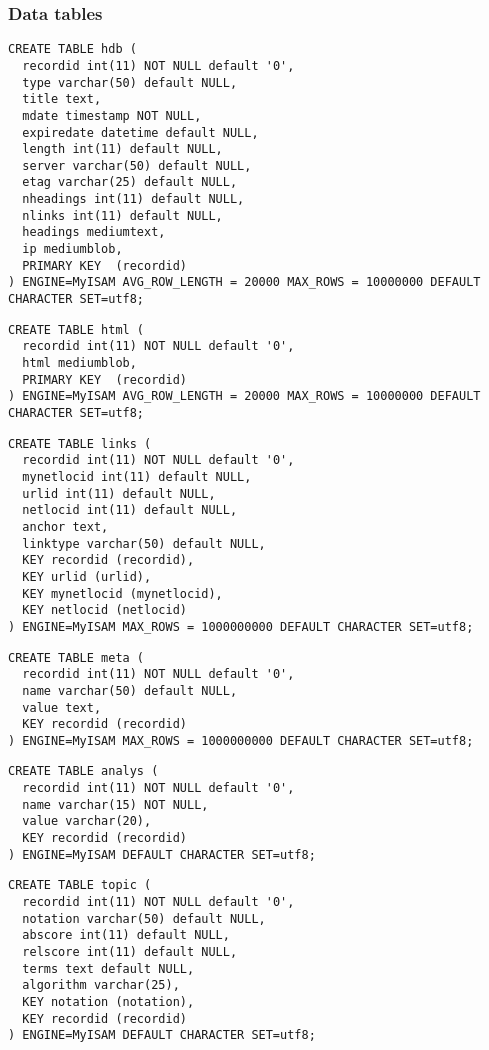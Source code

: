 \subsubsection{Data tables}
\begin{verbatim}
CREATE TABLE hdb (
  recordid int(11) NOT NULL default '0',
  type varchar(50) default NULL,
  title text,
  mdate timestamp NOT NULL,
  expiredate datetime default NULL,
  length int(11) default NULL,
  server varchar(50) default NULL,
  etag varchar(25) default NULL,
  nheadings int(11) default NULL,
  nlinks int(11) default NULL,
  headings mediumtext,
  ip mediumblob,
  PRIMARY KEY  (recordid)
) ENGINE=MyISAM AVG_ROW_LENGTH = 20000 MAX_ROWS = 10000000 DEFAULT CHARACTER SET=utf8;
\end{verbatim}

\begin{verbatim}
CREATE TABLE html (
  recordid int(11) NOT NULL default '0',
  html mediumblob,
  PRIMARY KEY  (recordid)
) ENGINE=MyISAM AVG_ROW_LENGTH = 20000 MAX_ROWS = 10000000 DEFAULT CHARACTER SET=utf8;
\end{verbatim}

\begin{verbatim}
CREATE TABLE links (
  recordid int(11) NOT NULL default '0',
  mynetlocid int(11) default NULL,
  urlid int(11) default NULL,
  netlocid int(11) default NULL,
  anchor text,
  linktype varchar(50) default NULL,
  KEY recordid (recordid),
  KEY urlid (urlid),
  KEY mynetlocid (mynetlocid),
  KEY netlocid (netlocid)
) ENGINE=MyISAM MAX_ROWS = 1000000000 DEFAULT CHARACTER SET=utf8;
\end{verbatim}

\begin{verbatim}
CREATE TABLE meta (
  recordid int(11) NOT NULL default '0',
  name varchar(50) default NULL,
  value text,
  KEY recordid (recordid)
) ENGINE=MyISAM MAX_ROWS = 1000000000 DEFAULT CHARACTER SET=utf8;
\end{verbatim}

\begin{verbatim}
CREATE TABLE analys (
  recordid int(11) NOT NULL default '0',
  name varchar(15) NOT NULL,
  value varchar(20),
  KEY recordid (recordid)
) ENGINE=MyISAM DEFAULT CHARACTER SET=utf8;
\end{verbatim}

\begin{verbatim}
CREATE TABLE topic (
  recordid int(11) NOT NULL default '0',
  notation varchar(50) default NULL,
  abscore int(11) default NULL,
  relscore int(11) default NULL,
  terms text default NULL,
  algorithm varchar(25),
  KEY notation (notation),
  KEY recordid (recordid)
) ENGINE=MyISAM DEFAULT CHARACTER SET=utf8;
\end{verbatim}


